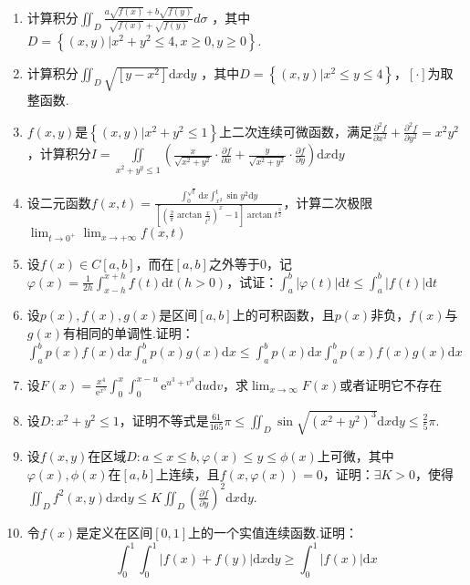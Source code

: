 \begin{enumerate}
	\item 计算积分$\iint_{D} \frac{a \sqrt{f(x)}+b \sqrt{f(y)}}{\sqrt{f(x)}+\sqrt{f(y)}} d \sigma$ ，其中$D=\left\{(x, y) | x^{2}+y^{2} \leqslant 4, x \geqslant 0, y \geqslant 0\right\}$.
	\item 计算积分$\iint_{D} \sqrt{\left[y-x^{2}\right]} \mathrm{d} x \mathrm{d} y$ ，其中$D=\left\{(x, y) | x^{2} \leqslant y \leqslant 4\right\}$，$[\cdot]$为取整函数.
	\item $f(x,y)$是$\left\{(x, y) | x^{2}+y^{2} \leqslant 1\right\}$上二次连续可微函数，满足$\frac{\partial^{2} f}{\partial x^{2}}+\frac{\partial^{2} f}{\partial y^{2}}=x^{2} y^{2}$，计算积分$I=\iint\limits_{x^{2}+y^{y} \leqslant 1}\left(\frac{x}{\sqrt{x^{2}+y^{2}}} \cdot \frac{\partial f}{\partial x}+\frac{y}{\sqrt{x^{2}+y^{2}}} \cdot \frac{\partial f}{\partial y}\right) \mathrm{d} x \mathrm{d} y$
	\item 设二元函数$f(x, t)=\frac{\int_{0}^{\sqrt{t}} \mathrm{d} x \int_{x^{2}}^{t} \sin y^{2} \mathrm{d} y}{\left[\left(\frac{2}{\pi} \arctan \frac{x}{t^{2}}\right)^{x}-1\right] \arctan t^{\frac{3}{2}}}$，计算二次极限$\lim _{t \rightarrow 0^{+}} \lim _{x \rightarrow+\infty} f(x, t)$
	\item 设$f(x)\in C[a,b]$，而在$[a,b]$之外等于0，记$\varphi(x)=\frac{1}{2 h} \int_{x-h}^{x+h} f(t) \mathrm{d} t(h>0)$，试证：$\int_{a}^{b}|\varphi(t)| \mathrm{d} t \leqslant \int_{a}^{b}|f(t)| \mathrm{d} t$
	
	\item 设$p(x),f(x),g(x)$是区间$[a,b]$上的可积函数，且$p(x)$非负，$f(x)$与$g(x)$有相同的单调性.证明：$\int_{a}^{b} p(x) f(x) \mathrm{d} x \int_{a}^{b} p(x) g(x) \mathrm{d} x \leqslant \int_{a}^{b} p(x) \mathrm{d} x \int_{a}^{b} p(x) f(x) g(x) \mathrm{d} x$
	\item 设$F(x)=\frac{x^{4}}{\mathrm{e}^{x^{3}}} \int_{0}^{x} \int_{0}^{x-u} \mathrm{e}^{u^{3}+v^{3}} \mathrm{d} u \mathrm{d} v$，求$\lim _{x \rightarrow \infty} F(x)$或者证明它不存在
	
	\item 设$D : x^{2}+y^{2} \leqslant 1$，证明不等式是$\frac{61}{165} \pi \leqslant \iint_{D} \sin \sqrt{\left(x^{2}+y^{2}\right)^{3}} \mathrm{d} x \mathrm{d} y \leqslant \frac{2}{5} \pi$.
	\item 设$f(x,y)$在区域$D : a \leqslant x \leqslant b, \varphi(x) \leqslant y \leqslant \phi(x)$上可微，其中$\varphi(x), \phi(x)$在$[a,b]$上连续，且$f(x, \varphi(x))=0$，证明：$\exists K>0$，使得$\iint_{D} f^{2}(x, y) \mathrm{d} x \mathrm{d} y \leqslant K \iint_{D}\left(\frac{\partial f}{\partial y}\right)^{2} \mathrm{d} x \mathrm{d} y$.
	\item 令$f(x)$是定义在区间$[0,1]$上的一个实值连续函数.证明：
\[
\int_{0}^{1} \int_{0}^{1}|f(x)+f(y)| \mathrm{d} x \mathrm{d} y \geqslant \int_{0}^{1}|f(x)| \mathrm{d} x
\]
	

\end{enumerate}
